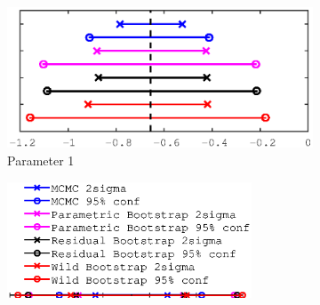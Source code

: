 \documentclass[11pt,a4paper,oneside]{report}
\begin{document}
\begin{figure}
   \centering
     \begin{subfigure}[b]{0.5\textwidth}
    \includegraphics[width=\textwidth, trim=0 0 0 0,clip=true]{figures/task5/uncert_model2_param1.eps}
    \caption{Parameter 1}
  \end{subfigure}%
    \begin{subfigure}[b]{0.5\textwidth}
    \includegraphics[width=0.8\textwidth, trim=0 15 0 0,clip=true]{figures/task5/uncert_legend.eps}\\\\\\
  \end{subfigure}%
  

\end{figure}
\end{document}
